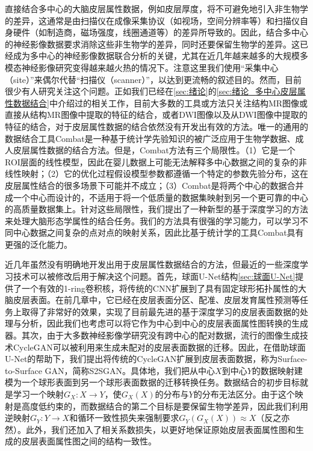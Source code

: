 直接结合多中心的大脑皮层属性数据，例如皮层厚度，将不可避免地引入非生物学的差异，这通常是由扫描仪在成像采集协议（如视场，空间分辨率等）和扫描仪自身硬件（如制造商，磁场强度，线圈通道等）的差异所导致的。因此，结合多中心的神经影像数据要求消除这些非生物学的差异，同时还要保留生物学的差异。这已经成为多中心的神经影像数据联合分析的关键，尤其在近几年越来越多的大规模多模态神经影像研究变得越来越火热的情况下。注意这里我们使用“采集中心（site）”来偶尔代替“扫描仪（scanner）”，以达到更流畅的叙述目的。然而，目前很少有人研究关注这个问题。正如我们已经在\ref{sec:绪论}的\ref{sec:绪论_多中心皮层属性数据结合}中介绍过的相关工作，目前大多数的工具或方法只关注结构MR图像或直接从结构MR图像中提取的特征的结合\cite{pomponio2020harmonization}，或者DWI图像以及从DWI图像中提取的特征的结合\cite{karayumak2019retrospective}，对于皮层属性数据的结合依然没有开发出有效的方法。唯一的通用的数据结合工具Combat\cite{fortin2018harmonization}是一种基于统计学先验知识的被广泛应用于生物学数据、成人皮层属性数据的结合方法。但是，Combat方法有三个局限性。（1）它是一个ROI层面的线性模型，因此在婴儿数据上可能无法解释多中心数据之间的复杂的非线性映射；（2）它的优化过程假设模型参数都遵循一个特定的参数先验分布，这在皮层属性结合的很多场景下可能并不成立；（3）Combat是将两个中心的数据合并成一个中心而设计的，不适用于将一个低质量的数据集映射到另一个更可靠的中心的高质量数据集上。针对这些局限性，我们提出了一种新型的基于深度学习的方法来处理大脑形态学属性的结合任务。我们的方法具有很强的学习能力，可以学习不同中心数据之间复杂的点对点的映射关系，因此比基于统计学的工具Combat具有更强的泛化能力。

近几年虽然没有明确地开发出用于皮层属性数据结合的方法，但最近的一些深度学习技术\cite{zhao2019spherical_ipmi,zhu2017unpaired}可以被修改后用于解决这个问题。首先，球面U-Net结构\ref{sec:球面U-Net}提供了一个有效的1-ring卷积核，将传统的CNN扩展到了具有固定球形拓扑属性的大脑皮层表面。在前几章中，它已经在皮层表面分区、配准、皮层发育属性预测等任务上取得了非常好的效果，实现了目前最先进的基于深度学习的皮层表面数据的处理与分析，因此我们也考虑可以将它作为中心到中心的皮层表面属性图转换的生成器。其次，由于大多数神经影像学研究没有跨中心的配对数据，流行的图像生成技术CycleGAN\cite{zhu2017unpaired}可以被利用来生成未配对的皮层表面数据的迁移。因此，在借助球面U-Net的帮助下，我们提出将传统的CycleGAN扩展到皮层表面数据，称为Surface-to-Surface GAN，简称S2SGAN。具体地，我们把从中心$X$到中心$Y$的数据映射建模为一个球形表面到另一个球形表面数据的迁移转换任务。数据结合的初步目标就是学习一个映射$G_X:X\rightarrow Y$，使$G_X(X)$的分布与$Y$的分布无法区分。由于这个映射是高度低约束的，而数据结合的第二个目标是要保留生物学差异，因此我们利用逆映射$G_Y: Y\rightarrow X$和循环一致性损失来强制要求$G_Y(G_X(X))\approx X$（反之亦然）。此外，我们还加入了相关系数损失，以更好地保证原始皮层表面属性图和生成的皮层表面属性图之间的结构一致性。	
	

